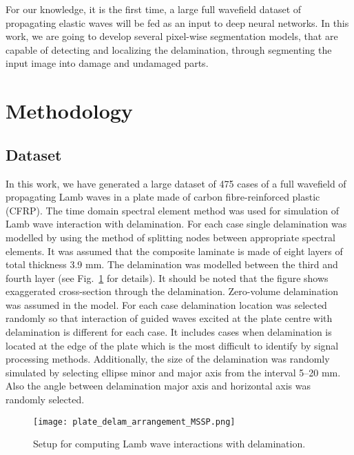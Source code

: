 \documentclass[preprint,9pt]{elsarticle}
\begin{document}
	For our knowledge, it is the first time, a large full wavefield dataset of propagating elastic waves will be fed as an input to deep neural networks.
	In this work, we are going to develop several pixel-wise segmentation models, that are capable of detecting and localizing the delamination, through segmenting the input image into damage and undamaged parts.

	\section{Methodology}
	\subsection{Dataset}
	In this work, we have generated a large dataset of 475 cases of a full wavefield of propagating Lamb waves in a plate made of carbon fibre-reinforced plastic (CFRP).
	The time domain spectral element method was used for simulation of Lamb wave interaction with delamination.
	For each case single delamination was modelled by using the method of splitting nodes between appropriate spectral elements. 
	It was assumed that the composite laminate is made of eight layers of total thickness 3.9 mm.
	The delamination was modelled between the third and fourth layer (see Fig.~\ref{fig:plate_setup} for details).
	It should be noted that the figure shows exaggerated cross-section through the delamination. 
	Zero-volume delamination was assumed in the model. 
	For each case delamination location was selected randomly so that interaction of guided waves excited at the plate centre with delamination is different for each case.
	It includes cases when delamination is located at the edge of the plate which is the most difficult to identify by signal processing methods.
	Additionally, the size of the delamination was randomly simulated by selecting ellipse minor and major axis from the interval 5--20 mm.
	Also the angle between delamination major axis and horizontal axis was randomly selected.
	\begin{figure}
		\centering
		\texttt{[image: plate\_delam\_arrangement\_MSSP.png]}
		\caption{Setup for computing Lamb wave interactions with delamination.}
		\label{fig:plate_setup}
	\end{figure}
\end{document}
